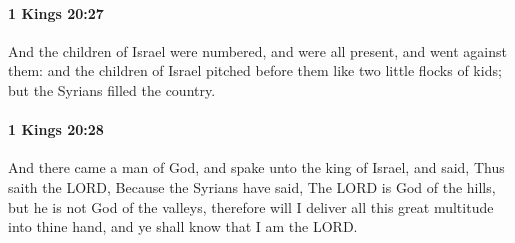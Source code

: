 		\paragraph{1 Kings 20:27} %
			\label{1KINGS-20-27}

			And the children of Israel were numbered, and were all present, and went against them: and the children of Israel pitched before them like two little flocks of kids; but the Syrians filled the country.


		\paragraph{1 Kings 20:28} %
			\label{1KINGS-20-28}

			And there came a man of God, and spake unto the king of Israel, and said, Thus saith the LORD, Because the Syrians have said, The LORD is God of the hills, but he is not God of the valleys, therefore will I deliver all this great multitude into thine hand, and ye shall know that I am the LORD.


